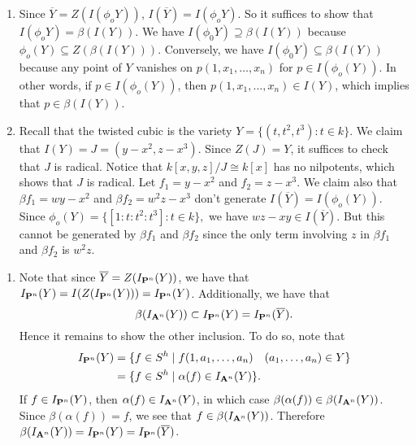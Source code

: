 \documentclass[10pt]{amsart}
\begin{document}
\begin{solution}
    \begin{enumerate}
        \item Since $\overline{Y} = Z(I(\phi_o Y))$, $I(\overline{Y}) = I(\phi_o Y)$. So it suffices to show that $I(\phi_o Y) = \beta(I(Y))$. We have $I(\phi_0 Y) \supseteq \beta(I(Y))$ because $\phi_o(Y) \subseteq Z(\beta(I(Y)))$. Conversely, we have $I(\phi_0 Y) \subseteq \beta(I(Y))$ because any point of $Y$ vanishes on $p(1,x_1,\dots, x_n)$ for $p \in I(\phi_o(Y))$. In other words, if $p \in I(\phi_o(Y))$, then $p(1,x_1,\dots, x_n) \in I(Y)$, which implies that $p \in \beta(I(Y))$.
        \item Recall that the twisted cubic is the variety $Y = \{(t,t^2,t^3): t \in k\}$. We claim that $I(Y) = J = (y-x^2,z-x^3).$ Since $Z(J) = Y$, it suffices to check that $J$ is radical. Notice that $k[x,y,z]/J \cong k[x]$ has no nilpotents, which shows that $J$ is radical. Let $f_1 = y-x^2$ and $f_2 = z-x^3$. We claim also that $\beta f_1 = wy-x^2$ and $\beta f_2 = w^2 z - x^3$ don't generate $I(\overline{Y}) = I(\phi_o(Y))$. Since $\phi_o(Y) = \{[1:t:t^2:t^3]: t\in k\},$ we have $wz-xy \in I(\overline{Y})$. But this cannot be generated by $\beta f_1$ and $\beta f_2$ since the only term involving $z$ in $\beta f_1$ and $\beta f_2$ is $w^2 z$.
    \end{enumerate}

       \begin{luke}
        \begin{enumerate}
            \item 
            Note that since $\overline{Y} =  Z(I_{\pp^n}(Y))$, we have that 
            $I_{\pp^n}(Y) = I(Z(I_{\pp^n}(Y))) = I_{\pp^n}(Y)$. Additionally, we 
            have that 
            \[
                \beta(I_{\aa^n}(Y)) \subset I_{\pp^n}(Y) = I_{\pp^n}(\overline{Y}).
            \]
            Hence it remains to show the other inclusion. To do so, note that 
            \begin{align*}
                I_{\pp^n}(Y) 
                &= 
                \{f \in S^h \mid f(1, a_1, \dots, a_n) \quad (a_1, \dots, a_n) \in Y\}\\
                &=
                \{f \in S^h \mid \alpha(f) \in I_{\aa^n}(Y)  \}.
            \end{align*}
            If $f \in I_{\pp^n}(Y)$, then $\alpha(f) \in I_{\aa^n}(Y)$, in which 
            case $\beta(\alpha(f)) \in \beta(I_{\aa^n}(Y))$. Since $\beta(\alpha(f)) = f$, we see 
            that $f \in \beta(I_{\aa^n}(Y))$. Therefore $\beta(I_{\aa^n}(Y)) = I_{\pp^n}(Y) = I_{\pp^n}(\overline{Y})$.  
            

\end{enumerate}
\end{luke}
\end{solution}
\end{document}
